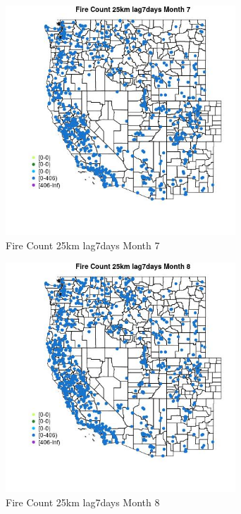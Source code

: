 \begin{figure} 
\centering  
\includegraphics[width=0.77\textwidth]{Code_Outputs/Report_ML_input_PM25_Step4_part_f_de_duplicated_aves_prioritize_24hr_obswNAs_MapObsMo7Fire_Count_25km_lag7days.jpg} 
\caption{\label{fig:Report_ML_input_PM25_Step4_part_f_de_duplicated_aves_prioritize_24hr_obswNAsMapObsMo7Fire_Count_25km_lag7days}Fire Count 25km lag7days Month 7} 
\end{figure} 
 

\begin{figure} 
\centering  
\includegraphics[width=0.77\textwidth]{Code_Outputs/Report_ML_input_PM25_Step4_part_f_de_duplicated_aves_prioritize_24hr_obswNAs_MapObsMo8Fire_Count_25km_lag7days.jpg} 
\caption{\label{fig:Report_ML_input_PM25_Step4_part_f_de_duplicated_aves_prioritize_24hr_obswNAsMapObsMo8Fire_Count_25km_lag7days}Fire Count 25km lag7days Month 8} 
\end{figure} 
 

